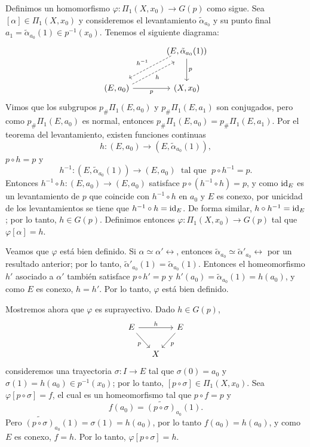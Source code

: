 \begin{dem}
Definimos un homomorfismo $\varphi \colon \Pi_1(X, x_0) \to G(p)$ como sigue. Sea $[\alpha] \in \Pi_1(X, x_0)$ y consideremos el levantamiento $\tilde{\alpha}_{a_0}$ y su punto final $a_1 = \tilde{\alpha}_{a_0}(1) \in p^{-1}(x_0)$. Tenemos el siguiente diagrama:
\[
\begin{tikzcd}[row sep=large, column sep=large]
 & \left(E, \tilde{\alpha}_{a_0}(1)\right) \arrow[d, "p"] \arrow[dl, "h^{-1}"', shift right=0.9ex, dashed] \\
(E, a_0) \arrow[ur, "h"', shift right=1ex, dashed] \arrow[r, "p"'] & (X, x_0)
\end{tikzcd}
\]
Vimos que los subgrupos $p_{\#}\Pi_1(E, a_0)$ y $p_{\#}\Pi_1(E, a_1)$ son conjugados, pero como $p_{\#}\Pi_1(E, a_0)$ es normal, entonces $p_{\#}\Pi_1(E, a_0) = p_{\#}\Pi_1(E, a_1)$. Por el teorema del levantamiento, existen funciones continuas
\[
h \colon (E, a_0) \to \left(E, \tilde{\alpha}_{a_0}(1)\right),
\]
  $p \circ h = p$ y
\[
h^{-1} \colon \left(E, \tilde{\alpha}_{a_0}(1)\right) \to (E, a_0)\; \text{ tal que }\; p \circ h^{-1} = p.
\]
Entonces $h^{-1} \circ h \colon (E, a_0) \to (E, a_0)$ satisface $p \circ (h^{-1} \circ h) = p$, y como $\mathrm{id}_E$ es un levantamiento de $p$ que coincide con $h^{-1} \circ h$ en $a_0$ y $E$ es conexo, por unicidad de los levantamientos se tiene que $h^{-1} \circ h = \mathrm{id}_E$. De forma similar, $h \circ h^{-1} = \mathrm{id}_E$; por lo tanto, $h \in G(p)$. Definimos entonces $\varphi \colon \Pi_1(X, x_0) \to G(p)$ tal que $\varphi[\alpha] = h$.

Veamos que $\varphi$ está bien definido. Si $\alpha \simeq \alpha'\rel$, entonces $\tilde{\alpha}_{a_0} \simeq \tilde{\alpha}'_{a_0}\rel$ por un resultado anterior; por lo tanto, $\tilde{\alpha}'_{a_0}(1) = \tilde{\alpha}_{a_0}(1)$. Entonces el homeomorfismo $h'$ asociado a $\alpha'$ también satisface $p \circ h' = p$ y $h'(a_0) = \tilde{\alpha}_{a_0}(1) = h(a_0)$, y como $E$ es conexo, $h = h'$. Por lo tanto, $\varphi$ está bien definido.

Mostremos ahora que \textit{$\varphi$} es suprayectivo. Dado $h \in G(p)$,
\[
\begin{tikzcd}[column sep=small]
E \arrow[rr, "h"] \arrow[dr, "p"'] & & E \arrow[dl, "p"] \\
& X &
\end{tikzcd}
\]
consideremos una trayectoria $\sigma \colon I \to E$ tal que $\sigma(0) = a_0$ y $\sigma(1) = h(a_0) \in p^{-1}(x_0)$; por lo tanto, $[p \circ \sigma] \in \Pi_1(X, x_0)$. Sea $\varphi[p \circ \sigma] = f$, el cual es un homeomorfismo tal que 
$p \circ f = p$ y 
$$f(a_0) = \widetilde{(p \circ \sigma)}_{a_0}(1).$$ 
Pero $\widetilde{(p \circ \sigma)}_{a_0}(1) = \sigma(1) = h(a_0)$, por lo tanto $f(a_0) = h(a_0)$, y como $E$ es conexo, $f = h$. Por lo tanto, $\varphi[p \circ \sigma] = h$.


\end{dem}

